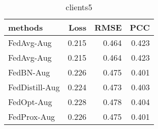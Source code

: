 \begin{table}
\caption{clients5}
\begin{tabular}{lrrr}
\toprule
methods & Loss & RMSE & PCC \\
\midrule
FedAvg-Aug & 0.215 & 0.464 & 0.423 \\
FedAvg-Aug & 0.215 & 0.464 & 0.423 \\
FedBN-Aug & 0.226 & 0.475 & 0.401 \\
FedDistill-Aug & 0.224 & 0.473 & 0.403 \\
FedOpt-Aug & 0.228 & 0.478 & 0.404 \\
FedProx-Aug & 0.226 & 0.475 & 0.401 \\
\bottomrule
\end{tabular}
\end{table}
